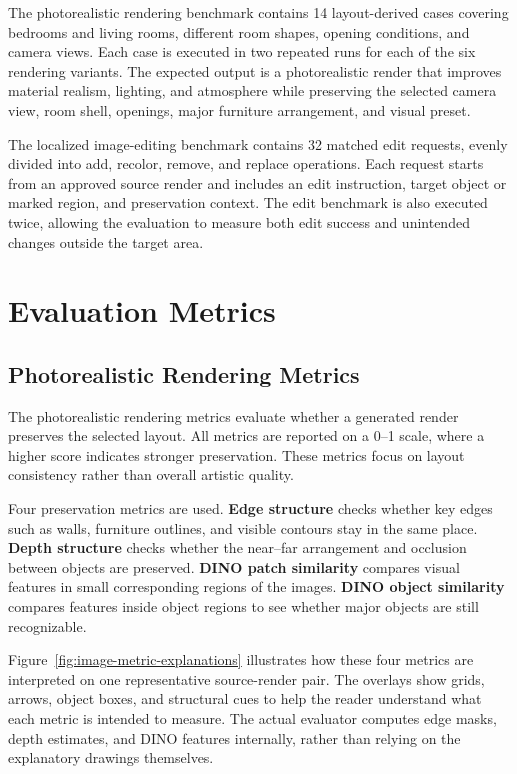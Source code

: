 The photorealistic rendering benchmark contains 14 layout-derived cases covering bedrooms and living rooms, different room shapes, opening conditions, and camera views. Each case is executed in two repeated runs for each of the six rendering variants. The expected output is a photorealistic render that improves material realism, lighting, and atmosphere while preserving the selected camera view, room shell, openings, major furniture arrangement, and visual preset.

The localized image-editing benchmark contains 32 matched edit requests, evenly divided into add, recolor, remove, and replace operations. Each request starts from an approved source render and includes an edit instruction, target object or marked region, and preservation context. The edit benchmark is also executed twice, allowing the evaluation to measure both edit success and unintended changes outside the target area.

\section{Evaluation Metrics}\label{subsec:eval-image-metrics}

\subsection{Photorealistic Rendering Metrics}

The photorealistic rendering metrics evaluate whether a generated render preserves the selected layout. All metrics are reported on a 0--1 scale, where a higher score indicates stronger preservation. These metrics focus on layout consistency rather than overall artistic quality.

Four preservation metrics are used. \textbf{Edge structure} checks whether key edges such as walls, furniture outlines, and visible contours stay in the same place. \textbf{Depth structure} checks whether the near--far arrangement and occlusion between objects are preserved. \textbf{DINO patch similarity} compares visual features in small corresponding regions of the images. \textbf{DINO object similarity} compares features inside object regions to see whether major objects are still recognizable.

Figure~\ref{fig:image-metric-explanations} illustrates how these four metrics are interpreted on one representative source-render pair. The overlays show grids, arrows, object boxes, and structural cues to help the reader understand what each metric is intended to measure. The actual evaluator computes edge masks, depth estimates, and DINO features internally, rather than relying on the explanatory drawings themselves.

